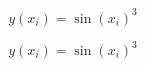 \documentclass[12pt]{article}
\begin{document}
\begin{equation}y(x_{i}) = \sin(x_{i})^{3}\end{equation}

\begin{equation}y(x_{i}) = \sin(x_{i})^{3}\end{equation}
\end{document}
